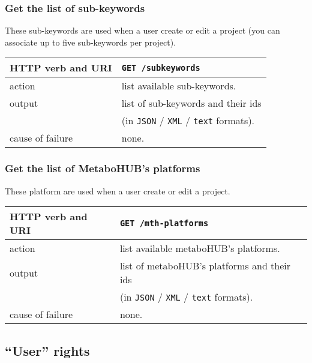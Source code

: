 \subsubsection{Get the list of sub-keywords}
\hspace*{\parindent}
These sub-keywords are used when a user create or edit a project
(you can associate up to five sub-keywords per project).
\newline
\begin{tabular}{ | l | l | }
	\hline
	HTTP verb and URI & \texttt{GET /subkeywords} \\
	\hline
	action & list available sub-keywords. \\
	\hline
	output & list of sub-keywords and their ids \\
	\space & (in \texttt{JSON} / \texttt{XML} / \texttt{text} formats). \\
	\hline
	cause of failure & none. \\
	\hline
\end{tabular}
\newline

\subsubsection{Get the list of MetaboHUB's platforms}
\hspace*{\parindent}
These platform are used when a user create or edit a project.
\newline
\begin{tabular}{ | l | l | }
	\hline
	HTTP verb and URI & \texttt{GET /mth-platforms} \\
	\hline
	action & list available metaboHUB's platforms. \\
	\hline
	output & list of metaboHUB's platforms and their ids \\
	\space & (in \texttt{JSON} / \texttt{XML} / \texttt{text} formats). \\
	\hline
	cause of failure & none. \\
	\hline
\end{tabular}
\newline

\subsection{``User'' rights}


